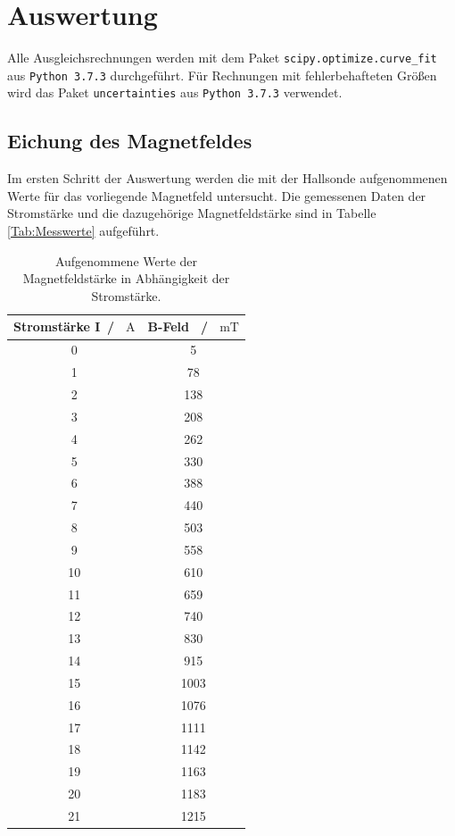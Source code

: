 \section{Auswertung}
Alle Ausgleichsrechnungen werden mit dem Paket \texttt{scipy.optimize.curve\_fit}  aus \texttt{Python 3.7.3} durchgeführt.
Für Rechnungen mit fehlerbehafteten Größen wird das Paket \texttt{uncertainties} aus \texttt{Python 3.7.3} verwendet.

\subsection{Eichung des Magnetfeldes}
Im ersten Schritt der Auswertung werden die mit der Hallsonde aufgenommenen Werte für das 
vorliegende Magnetfeld untersucht. Die gemessenen Daten der Stromstärke und die dazugehörige 
Magnetfeldstärke sind in Tabelle \ref{Tab:Messwerte} aufgeführt.
\begin{table}[H]
    \centering
    \caption{Aufgenommene Werte der Magnetfeldstärke in Abhängigkeit der Stromstärke.}
    \label{tab:Messwerte}
    \begin{tabular}{cc}
      \toprule
      Stromstärke I\, / \, $\si{\ampere}$ & B-Feld \, / \, $\si{\milli\tesla}$  \\
      \midrule
      0 &    5 \\
      1 &   78 \\
      2 &  138 \\
      3 &  208 \\
      4 &  262 \\
      5 &  330 \\
      6 &  388 \\
      7 &  440 \\
      8 &  503 \\
      9 &  558 \\
     10 &  610 \\
     11 &  659 \\
     12 &  740 \\
     13 &  830 \\
     14 &  915 \\
     15 & 1003 \\
     16 & 1076 \\
     17 & 1111 \\
     18 & 1142 \\
     19 & 1163 \\
     20 & 1183 \\
     21 & 1215 \\
      \bottomrule
  \end{tabular}
 \end{table} \noindent
